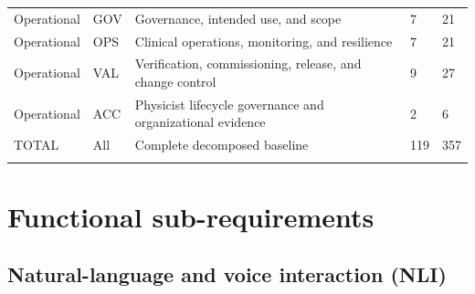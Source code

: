 \documentclass[11pt,letterpaper]{article}
\begin{document}
\begin{small}
\begin{longtable}{@{}L{0.13\textwidth}L{0.08\textwidth}L{0.45\textwidth}L{0.11\textwidth}L{0.11\textwidth}@{}}
Operational & GOV & Governance, intended use, and scope & 7 & 21 \\
\addlinespace[2pt]
Operational & OPS & Clinical operations, monitoring, and resilience & 7 & 21 \\
\addlinespace[2pt]
Operational & VAL & Verification, commissioning, release, and change control & 9 & 27 \\
\addlinespace[2pt]
Operational & ACC & Physicist lifecycle governance and organizational evidence & 2 & 6 \\
\addlinespace[2pt]
TOTAL & All & Complete decomposed baseline & 119 & 357 \\
\addlinespace[2pt]
\end{longtable}
\end{small}

\section{Functional sub-requirements}

\subsection{Natural-language and voice interaction (NLI)}
\end{document}
